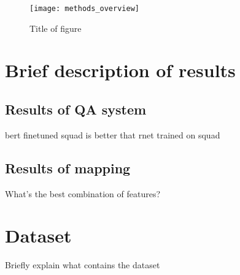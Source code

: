 \begin{figure}
\centering
\texttt{[image: methods\_overview]}
\caption{Title of figure}
\medskip
\end{figure}

\section{Brief description of results}
\label{sec:brief_results}

\subsection{Results of QA system}
bert finetuned squad is better that rnet trained on squad

\subsection{Results of mapping}
What's the best combination of features?

\section{Dataset}
Briefly explain what contains the dataset
